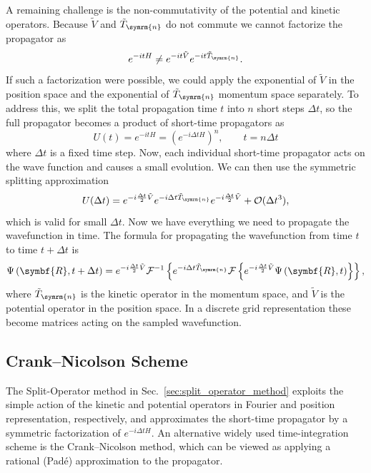 A remaining challenge is the non-commutativity of the potential and kinetic operators. Because $\tilde{V}$ and $\tilde{T}_{\symrm{n}}$ do not commute we cannot factorize the propagator as
\begin{equation}
e^{-i t H}\neq e^{-i t\tilde{V}}e^{-i t\tilde{T}_{\symrm{n}}}.
\end{equation}
If such a factorization were possible, we could apply the exponential of $\tilde{V}$ in the position space and the exponential of $\tilde{T}_{\symrm{n}}$ momentum space separately. To address this, we split the total propagation time $t$ into $n$ short steps $\Delta t$, so the full propagator becomes a product of short-time propagators as
\begin{equation}
U(t)=e^{-i t H}=\left(e^{-i\Delta t H}\right)^n,\qquad t=n\Delta t
\end{equation}
where $\Delta t$ is a fixed time step. Now, each individual short-time propagator acts on the wave function and causes a small evolution. We can then use the symmetric splitting approximation
\begin{equation}
U(\Delta t)=e^{-i\frac{\Delta t}{2}\tilde{V}}e^{-i\Delta t\tilde{T}_{\symrm{n}}}e^{-i\frac{\Delta t}{2}\tilde{V}}+\mathcal{O}(\Delta t^3),
\end{equation}
which is valid for small $\Delta t$. Now we have everything we need to propagate the wavefunction in time. The formula for propagating the wavefunction from time $t$ to time $t+\Delta t$ is
\begin{equation}
\Psi\left(\symbf{R},t+\Delta t\right)=e^{-i\frac{\Delta t}{2}\tilde V}\mathcal{F}^{-1}\left\lbrace e^{-i\Delta t\tilde{T}_{\symrm{n}}}\mathcal{F}\left\lbrace e^{-i\frac{\Delta t}{2}\tilde V}\Psi\left(\symbf{R},t\right)\right\rbrace\right\rbrace,
\end{equation}
where $\tilde{T}_{\symrm{n}}$ is the kinetic operator in the momentum space, and $\tilde{V}$ is the potential operator in the position space. In a discrete grid representation these become matrices acting on the sampled wavefunction.
\subsection{Crank--Nicolson Scheme}\label{sec:crank_nicolson_scheme}
The Split-Operator method in Sec.~\ref{sec:split_operator_method} exploits the simple action
of the kinetic and potential operators in Fourier and position representation, respectively,
and approximates the short-time propagator by a symmetric factorization of
$e^{-i\Delta t H}$. An alternative widely used time-integration scheme is the
Crank--Nicolson method, which can be viewed as applying a rational (Padé) approximation to
the propagator.

